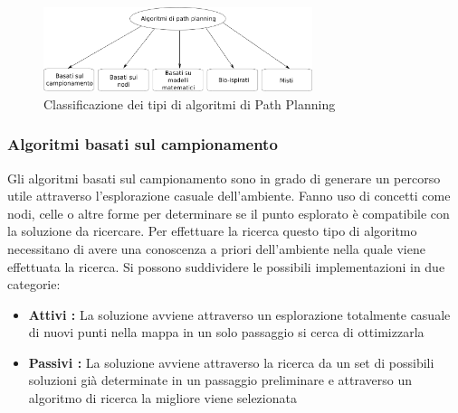 \begin{figure}
	\centering
	\includegraphics[width=0.7\textwidth]{SistemaQuadrirotore/Figure/Path}
	\caption{Classificazione dei tipi di algoritmi di Path Planning \cite{YangLiang2016SoR3}}
\end{figure}


\subsubsection{Algoritmi basati sul campionamento}

Gli algoritmi basati sul campionamento sono in grado di generare un percorso utile attraverso l'esplorazione casuale dell'ambiente. Fanno uso di concetti come nodi, celle o altre forme per determinare se il punto esplorato è compatibile con la soluzione da ricercare. Per effettuare la ricerca questo tipo di algoritmo necessitano di avere una conoscenza a priori dell'ambiente nella quale viene effettuata la ricerca.
Si possono suddividere le possibili implementazioni in due categorie:
\begin{itemize}
	\item \textbf{Attivi : } La soluzione avviene attraverso un esplorazione totalmente casuale di nuovi punti nella mappa in un solo passaggio si cerca di ottimizzarla
	\item \textbf{Passivi : }  La soluzione avviene attraverso la ricerca da un set di possibili soluzioni già determinate in un passaggio preliminare e attraverso un algoritmo di ricerca la migliore viene selezionata
\end{itemize}




